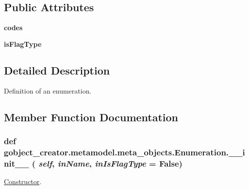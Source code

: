 \subsection*{Public Attributes}
\begin{DoxyCompactItemize}
\item 
\hypertarget{classgobject__creator_1_1metamodel_1_1meta__objects_1_1Enumeration_a414d35603cd18245e748d01bf11c5efa}{
{\bfseries codes}}
\label{classgobject__creator_1_1metamodel_1_1meta__objects_1_1Enumeration_a414d35603cd18245e748d01bf11c5efa}

\item 
\hypertarget{classgobject__creator_1_1metamodel_1_1meta__objects_1_1Enumeration_a8f43bac1f7dbdcab4054cff4f24c162b}{
{\bfseries isFlagType}}
\label{classgobject__creator_1_1metamodel_1_1meta__objects_1_1Enumeration_a8f43bac1f7dbdcab4054cff4f24c162b}

\end{DoxyCompactItemize}


\subsection{Detailed Description}
Definition of an enumeration. 

\subsection{Member Function Documentation}
\hypertarget{classgobject__creator_1_1metamodel_1_1meta__objects_1_1Enumeration_a27e023ebbfbbdb4858a8fbcf92641b6e}{
\subsubsection[{\_\-\_\-init\_\-\_\-}]{\setlength{\rightskip}{0pt plus 5cm}def gobject\_\-creator.metamodel.meta\_\-objects.Enumeration.\_\-\_\-init\_\-\_\- ( {\em self}, \/   {\em inName}, \/   {\em inIsFlagType} = {\ttfamily False})}}
\label{classgobject__creator_1_1metamodel_1_1meta__objects_1_1Enumeration_a27e023ebbfbbdb4858a8fbcf92641b6e}


\hyperlink{classgobject__creator_1_1metamodel_1_1meta__objects_1_1Constructor}{Constructor}. 


